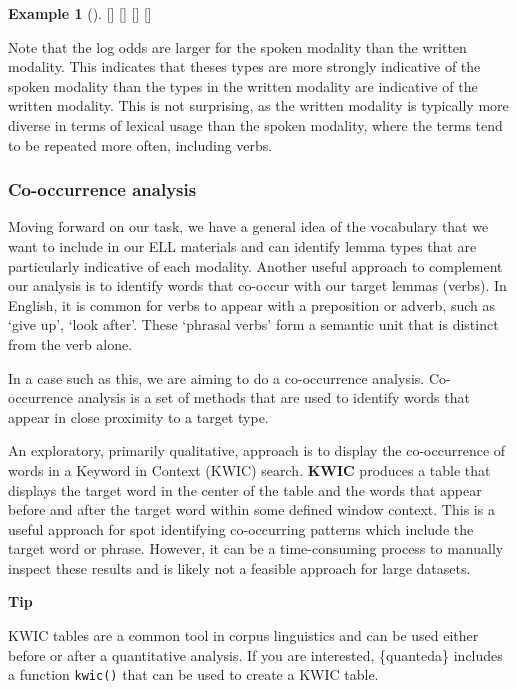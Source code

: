 \documentclass[
  letterpaper,
  krantz1]{latex/krantz-mod}
\newcommand{\cindex}[1]{%
  \StrSubstitute{#1}{_}{\_}[\temp]%
  \index{\temp}%
}
\theoremstyle{definition}
\theoremstyle{definition}
\newtheorem{example}{Example}[chapter]
\theoremstyle{remark}
\begin{document}
\begin{example}[]
\cindex{group_by()}\cindex{filter()}\cindex{slice_max()}\cindex{select()}

\end{example}

Note that the log odds are larger for the spoken modality than the
written modality. This indicates that theses types are more strongly
indicative of the spoken modality than the types in the written modality
are indicative of the written modality. This is not surprising, as the
written modality is typically more diverse in terms of lexical usage
than the spoken modality, where the terms tend to be repeated more
often, including verbs.

\subsubsection{Co-occurrence analysis}\label{sec-explore-co-occurrence}

Moving forward on our task, we have a general idea of the vocabulary
that we want to include in our ELL materials and can identify lemma
types that are particularly indicative of each modality. Another useful
approach to complement our analysis is to identify words that co-occur
with our target lemmas (verbs). In English, it is common for verbs to
appear with a preposition or adverb, such as `give up', `look after'.
These `phrasal verbs' form a semantic unit that is distinct from the
verb alone.

In a case such as this, we are aiming to do a co-occurrence analysis.
Co-occurrence analysis is a set of methods
that are used to identify words that appear in close proximity to a
target type.

An exploratory, primarily qualitative, approach is to display the
co-occurrence of words in a Keyword in Context (KWIC) search.
\textbf{KWIC} produces a table that
displays the target word in the center of the table and the words that
appear before and after the target word within some defined window
context. This is a useful approach for spot identifying co-occurring
patterns which include the target word or phrase. However, it can be a
time-consuming process to manually inspect these results and is likely
not a feasible approach for large datasets.

\begin{tcolorbox}[enhanced jigsaw, toprule=.15mm, breakable, colback=white, arc=.35mm, left=2mm, colframe=quarto-callout-color-frame, opacityback=0, bottomrule=.15mm, rightrule=.15mm, leftrule=.75mm]

\textbf{ Tip}

KWIC tables are a common tool in corpus linguistics and can be used
either before or after a quantitative analysis. If you are interested,
\{quanteda\} includes a function \texttt{kwic()} that can be used to
create a KWIC table.

\end{tcolorbox}
\end{document}
